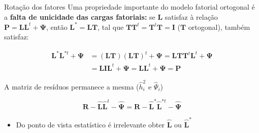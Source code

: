 \documentclass[
  ignorenonframetext,
  aspectratio=169,
]{beamer}
\providecommand{\tightlist}{%
  \setlength{\itemsep}{0pt}\setlength{\parskip}{0pt}}
\begin{document}
\begin{frame}{Rotação dos fatores}
\label{rotauxe7uxe3o-dos-fatores}
Uma propriedade importante do modelo fatorial ortogonal é a
\textbf{falta de unicidade das cargas fatoriais:} se \(\boldsymbol{L}\)
satisfaz à relação
\(\boldsymbol{P} = \boldsymbol{L}\boldsymbol{L}^t + \boldsymbol{\Psi}\),
então \(\boldsymbol{L}^* = \boldsymbol{L} \boldsymbol{T}\), tal que
\(\boldsymbol{T} \boldsymbol{T}^t = \boldsymbol{T}^t\boldsymbol{T} = \boldsymbol{I}\)
(\(\boldsymbol{T}\) ortogonal), também satisfaz:

\[
\begin{aligned}
\boldsymbol{L}^* \boldsymbol{L}^{*t} + \boldsymbol{\Psi} &= (\boldsymbol{L} \boldsymbol{T})(\boldsymbol{L} \boldsymbol{T})^t + \boldsymbol{\Psi} = \boldsymbol{L} \boldsymbol{T}\boldsymbol{T}^t \boldsymbol{L}^t + \boldsymbol{\Psi} \\ &= \boldsymbol{L} \boldsymbol{I} \boldsymbol{L}^t + \boldsymbol{\Psi} = 
\boldsymbol{L}\boldsymbol{L}^t + \boldsymbol{\Psi } = \boldsymbol{P}
\end{aligned}
\]

\pause

A matriz de resíduos permanece a mesma (\(\hat{h}_i^2\) e
\(\hat{\Psi}_i\))

\[\boldsymbol{R} - \hat{\boldsymbol{L}} \hat{\boldsymbol{L}}^t - \hat{\boldsymbol{\Psi}} = \boldsymbol{R} - \hat{\boldsymbol{L}}^* \hat{\boldsymbol{L}}^{*t} - \hat{\boldsymbol{\Psi}}\]

\pause

\begin{itemize}
\tightlist
\item
  Do ponto de vista estatístico é irrelevante obter
  \(\hat{\boldsymbol{L}}\) ou \(\hat{\boldsymbol{L}}^*\)
\end{itemize}
\end{frame}
\end{document}
